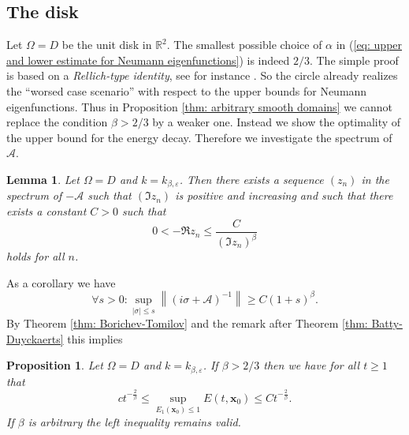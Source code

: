 \documentclass{amsart}
\newcommand{\abs}[1]{\left|#1\right|}
\newcommand{\norm}[1]{\left\| #1 \right\|}
\newcommand{\A}{\mathcal{A}}
\newcommand{\xnice}{\mathbf{x}}
\newcommand{\R}{\mathbb{R}}
\newtheorem{Proposition}[Theorem]{Proposition}
\newtheorem{Lemma}[Theorem]{Lemma}
\begin{document}
\subsection{The disk}\label{sec: examples disk}
Let $\Omega=D$ be the unit disk in $\R^2$. The smallest possible choice of $\alpha$ in (\ref{eq: upper and lower estimate for Neumann eigenfunctions}) is indeed $2/3$. The simple proof is based on a \emph{Rellich-type identity}, see for instance \cite[page 5]{BarnettHassellTacy2016}. So the circle already realizes the ``worsed case scenario'' with respect to the upper bounds for Neumann eigenfunctions. Thus in Proposition \ref{thm: arbitrary smooth domains} we cannot replace the condition $\beta>2/3$ by a weaker one. Instead we  show the optimality of the upper bound for the energy decay. Therefore we investigate the spectrum of $\A$.
\begin{Lemma}\label{thm: spectrum on disk}
 Let $\Omega=D$ and $k=k_{\beta,\varepsilon}$. Then there exists a sequence $(z_n)$ in the spectrum of $-\A$ such that $(\Im z_n)$ is positive and increasing and such that there exists a constant $C>0$ such that
 \begin{equation}\nonumber
   0 < -\Re z_n \leq \frac{C}{(\Im z_n)^{\beta}}
 \end{equation}
 holds for all $n$.
\end{Lemma}
As a corollary we have
\begin{equation}\nonumber
  \forall s>0: \sup_{\abs{\sigma}\leq s} \norm{(i\sigma+\A)^{-1}} \geq C (1+s)^{\beta}.
\end{equation}
By Theorem \ref{thm: Borichev-Tomilov} and the remark after Theorem \ref{thm: Batty-Duyckaerts} this implies
\begin{Proposition}
 Let $\Omega=D$ and $k=k_{\beta,\varepsilon}$. If $\beta>2/3$ then we have for all $t\geq1$ that
 \begin{equation}\nonumber
  c t^{-\frac{2}{\beta}} \leq \sup_{E_1(\xnice_0)\leq 1} E(t, \xnice_0) \leq C t^{-\frac{2}{\beta}} .
 \end{equation}
 If $\beta$ is arbitrary the left inequality remains valid.
\end{Proposition}
\end{document}
